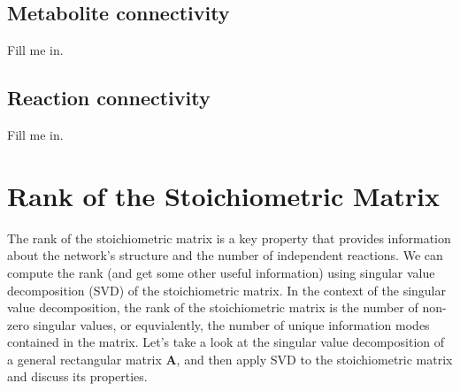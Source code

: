 \documentclass{article}[11pt]
\begin{document}
\subsection{Metabolite connectivity}
Fill me in.

\subsection{Reaction connectivity}
Fill me in.

\section{Rank of the Stoichiometric Matrix}
The rank of the stoichiometric matrix is a key property that provides information about the network's structure and the number of independent reactions.
We can compute the rank (and get some other useful information) using singular value decomposition (SVD) of the stoichiometric matrix.
In the context of the singular value decomposition, the rank of the stoichiometric matrix is the number of non-zero singular values, 
or equvialently, the number of unique information modes contained in the matrix. 
Let's take a look at the singular value decomposition of a general rectangular matrix $\mathbf{A}$, 
and then apply SVD to the stoichiometric matrix and discuss its properties.
\end{document}
